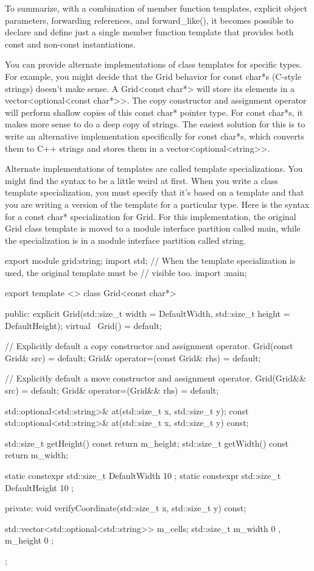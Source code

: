 To summarize, with a combination of member function templates, explicit object parameters, forwarding references, and forward\_like(), it becomes possible to declare and define just a single member function template that provides both const and non-const instantiations.


You can provide alternate implementations of class templates for specific types. For example, you might decide that the Grid behavior for const char*s (C-style strings) doesn’t make sense. A Grid<const char*> will store its elements in a vector<optional<const char*>{}>. The copy constructor and assignment operator will perform shallow copies of this const char* pointer type. For const char*s, it makes more sense to do a deep copy of strings. The easiest solution for this is to write an alternative implementation specifically for const char*s, which converts them to C++ strings and stores them in a vector<optional<string>{}>.

Alternate implementations of templates are called template specializations. You might find the syntax to be a little weird at first. When you write a class template specialization, you must specify that it’s based on a template and that you are writing a version of the template for a particular type. Here is the syntax for a const char* specialization for Grid. For this implementation, the original Grid class template is moved to a module interface partition called main, while the specialization is in a module interface partition called string.


\begin{cpp}
export module grid:string;
import std;
// When the template specialization is used, the original template must be
// visible too.
import :main;

export template <>
class Grid<const char*>
{
    public:
        explicit Grid(std::size_t width = DefaultWidth,
            std::size_t height = DefaultHeight);
        virtual ~Grid() = default;

        // Explicitly default a copy constructor and assignment operator.
        Grid(const Grid& src) = default;
        Grid& operator=(const Grid& rhs) = default;

        // Explicitly default a move constructor and assignment operator.
        Grid(Grid&& src) = default;
        Grid& operator=(Grid&& rhs) = default;

        std::optional<std::string>& at(std::size_t x, std::size_t y);
        const std::optional<std::string>& at(std::size_t x, std::size_t y) const;

        std::size_t getHeight() const { return m_height; }
        std::size_t getWidth() const { return m_width; }

        static constexpr std::size_t DefaultWidth { 10 };
        static constexpr std::size_t DefaultHeight { 10 };

    private:
        void verifyCoordinate(std::size_t x, std::size_t y) const;

        std::vector<std::optional<std::string>> m_cells;
        std::size_t m_width { 0 }, m_height { 0 };
};
\end{cpp}

